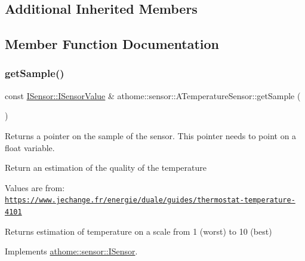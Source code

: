 \subsection*{Additional Inherited Members}


\subsection{Member Function Documentation}
\mbox{\label{classathome_1_1sensor_1_1_a_temperature_sensor_afea6a461b8dff9ee736aa508aa4f6a3c}} 
\subsubsection{\texorpdfstring{get\+Sample()}{getSample()}}
{\footnotesize\ttfamily const \mbox{\hyperlink{structathome_1_1sensor_1_1_i_sensor_1_1_i_sensor_value}{I\+Sensor\+::\+I\+Sensor\+Value}} \& athome\+::sensor\+::\+A\+Temperature\+Sensor\+::get\+Sample (\begin{DoxyParamCaption}{ }\end{DoxyParamCaption})\hspace{0.3cm}{\ttfamily [virtual]}}

Returns a pointer on the sample of the sensor. This pointer needs to point on a float variable.

Return an estimation of the quality of the temperature

Values are from\+: \href{https://www.jechange.fr/energie/duale/guides/thermostat-temperature-4101}{\tt https\+://www.\+jechange.\+fr/energie/duale/guides/thermostat-\/temperature-\/4101} \begin{DoxyReturn}{Returns}
estimation of temperature on a scale from 1 (worst) to 10 (best) 
\end{DoxyReturn}


Implements \mbox{\hyperlink{classathome_1_1sensor_1_1_i_sensor_ae109cd3741ea9c88dc7e4f2eaf1485d5}{athome\+::sensor\+::\+I\+Sensor}}.

\mbox{\label{classathome_1_1sensor_1_1_a_temperature_sensor_a4e5b2c79ab69f6903f7b322da45b0af4}} 
